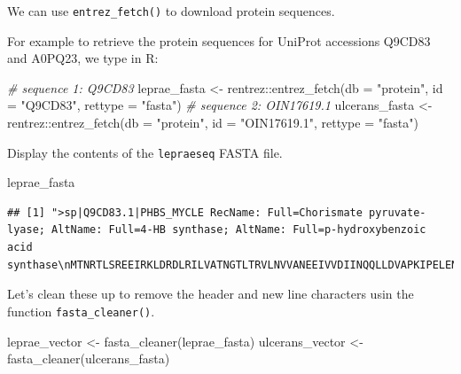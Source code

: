 \documentclass[
]{book}
\newenvironment{Shaded}{\begin{snugshade}}{\end{snugshade}}
\newcommand{\AttributeTok}[1]{\textcolor[rgb]{0.77,0.63,0.00}{#1}}
\newcommand{\CommentTok}[1]{\textcolor[rgb]{0.56,0.35,0.01}{\textit{#1}}}
\newcommand{\FunctionTok}[1]{\textcolor[rgb]{0.00,0.00,0.00}{#1}}
\newcommand{\NormalTok}[1]{#1}
\newcommand{\OtherTok}[1]{\textcolor[rgb]{0.56,0.35,0.01}{#1}}
\newcommand{\SpecialCharTok}[1]{\textcolor[rgb]{0.00,0.00,0.00}{#1}}
\newcommand{\StringTok}[1]{\textcolor[rgb]{0.31,0.60,0.02}{#1}}
\begin{document}
We can use \texttt{entrez\_fetch()} to download protein sequences.

For example to retrieve the protein sequences for UniProt accessions Q9CD83 and A0PQ23, we type in R:

\begin{Shaded}
\begin{Highlighting}[]
\CommentTok{\# sequence 1: Q9CD83}
\NormalTok{leprae\_fasta }\OtherTok{\textless{}{-}}\NormalTok{ rentrez}\SpecialCharTok{::}\FunctionTok{entrez\_fetch}\NormalTok{(}\AttributeTok{db =} \StringTok{"protein"}\NormalTok{,}
                        \AttributeTok{id =} \StringTok{"Q9CD83"}\NormalTok{,}
                         \AttributeTok{rettype =} \StringTok{"fasta"}\NormalTok{)}
\CommentTok{\# sequence 2: OIN17619.1}
\NormalTok{ulcerans\_fasta }\OtherTok{\textless{}{-}}\NormalTok{ rentrez}\SpecialCharTok{::}\FunctionTok{entrez\_fetch}\NormalTok{(}\AttributeTok{db =} \StringTok{"protein"}\NormalTok{,}
                         \AttributeTok{id =} \StringTok{"OIN17619.1"}\NormalTok{,}
                         \AttributeTok{rettype =} \StringTok{"fasta"}\NormalTok{)}
\end{Highlighting}
\end{Shaded}

Display the contents of the \texttt{lepraeseq} FASTA file.

\begin{Shaded}
\begin{Highlighting}[]
\NormalTok{leprae\_fasta}
\end{Highlighting}
\end{Shaded}

\begin{verbatim}
## [1] ">sp|Q9CD83.1|PHBS_MYCLE RecName: Full=Chorismate pyruvate-lyase; AltName: Full=4-HB synthase; AltName: Full=p-hydroxybenzoic acid synthase\nMTNRTLSREEIRKLDRDLRILVATNGTLTRVLNVVANEEIVVDIINQQLLDVAPKIPELENLKIGRILQR\nDILLKGQKSGILFVAAESLIVIDLLPTAITTYLTKTHHPIGEIMAASRIETYKEDAQVWIGDLPCWLADY\nGYWDLPKRAVGRRYRIIAGGQPVIITTEYFLRSVFQDTPREELDRCQYSNDIDTRSGDRFVLHGRVFKNL\n\n"
\end{verbatim}

Let's clean these up to remove the header and new line characters usin the function \texttt{fasta\_cleaner()}.

\begin{Shaded}
\begin{Highlighting}[]
\NormalTok{leprae\_vector   }\OtherTok{\textless{}{-}} \FunctionTok{fasta\_cleaner}\NormalTok{(leprae\_fasta)}
\NormalTok{ulcerans\_vector }\OtherTok{\textless{}{-}} \FunctionTok{fasta\_cleaner}\NormalTok{(ulcerans\_fasta)}
\end{Highlighting}
\end{Shaded}
\end{document}
